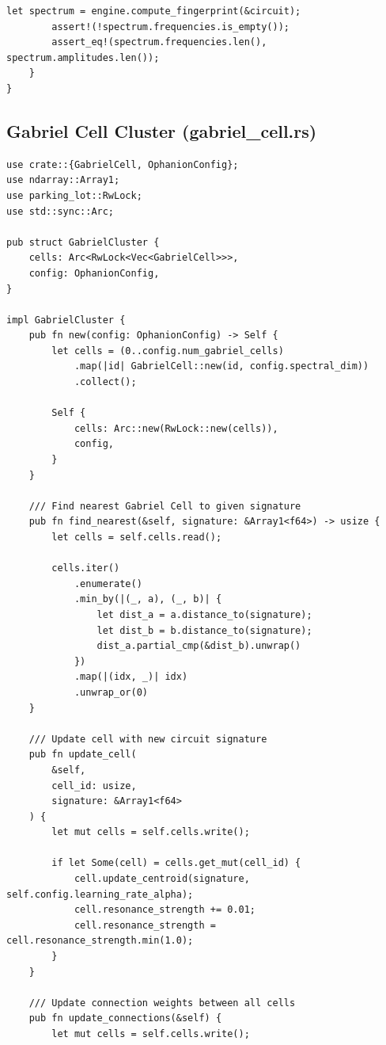 \documentclass[11pt,a4paper]{article}
\begin{document}
\begin{lstlisting}[style=rust]
        let spectrum = engine.compute_fingerprint(&circuit);
        assert!(!spectrum.frequencies.is_empty());
        assert_eq!(spectrum.frequencies.len(), spectrum.amplitudes.len());
    }
}
\end{lstlisting}

\subsection{Gabriel Cell Cluster (gabriel\_cell.rs)}

\begin{lstlisting}[style=rust]
use crate::{GabrielCell, OphanionConfig};
use ndarray::Array1;
use parking_lot::RwLock;
use std::sync::Arc;

pub struct GabrielCluster {
    cells: Arc<RwLock<Vec<GabrielCell>>>,
    config: OphanionConfig,
}

impl GabrielCluster {
    pub fn new(config: OphanionConfig) -> Self {
        let cells = (0..config.num_gabriel_cells)
            .map(|id| GabrielCell::new(id, config.spectral_dim))
            .collect();
        
        Self {
            cells: Arc::new(RwLock::new(cells)),
            config,
        }
    }
    
    /// Find nearest Gabriel Cell to given signature
    pub fn find_nearest(&self, signature: &Array1<f64>) -> usize {
        let cells = self.cells.read();
        
        cells.iter()
            .enumerate()
            .min_by(|(_, a), (_, b)| {
                let dist_a = a.distance_to(signature);
                let dist_b = b.distance_to(signature);
                dist_a.partial_cmp(&dist_b).unwrap()
            })
            .map(|(idx, _)| idx)
            .unwrap_or(0)
    }
    
    /// Update cell with new circuit signature
    pub fn update_cell(
        &self, 
        cell_id: usize, 
        signature: &Array1<f64>
    ) {
        let mut cells = self.cells.write();
        
        if let Some(cell) = cells.get_mut(cell_id) {
            cell.update_centroid(signature, self.config.learning_rate_alpha);
            cell.resonance_strength += 0.01;
            cell.resonance_strength = cell.resonance_strength.min(1.0);
        }
    }
    
    /// Update connection weights between all cells
    pub fn update_connections(&self) {
        let mut cells = self.cells.write();
        

\end{lstlisting}
\end{document}

